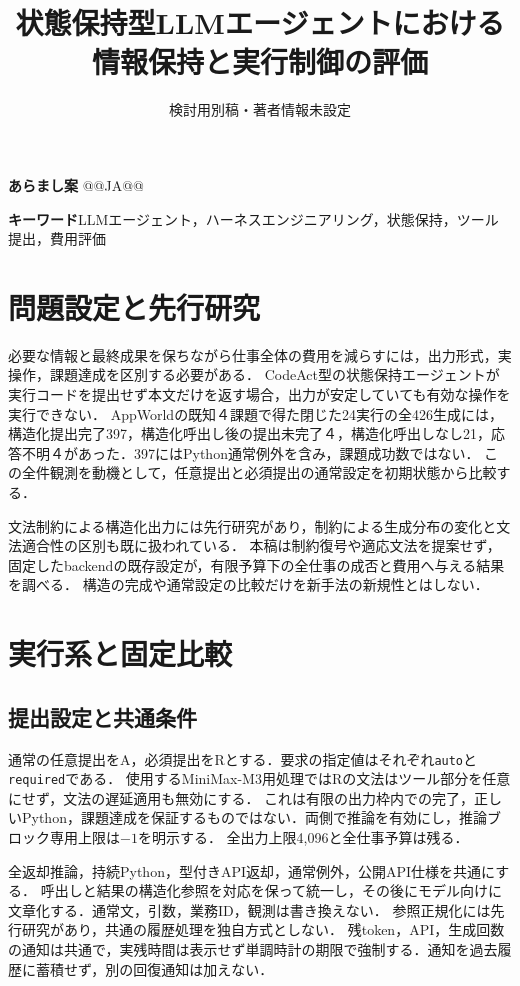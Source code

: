 \documentclass[uplatex,a4paper,twocolumn,10pt]{jsarticle}
\title{状態保持型LLMエージェントにおける\newline 情報保持と実行制御の評価}
\author{検討用別稿・著者情報未設定}
\date{}
\begin{document}
\raggedbottom
\maketitle
\noindent\textbf{あらまし案}\quad
@@JA@@

\noindent\textbf{キーワード}\quad LLMエージェント，ハーネスエンジニアリング，状態保持，ツール提出，費用評価

\section{問題設定と先行研究}
必要な情報と最終成果を保ちながら仕事全体の費用を減らすには，出力形式，実操作，課題達成を区別する必要がある．
CodeAct\cite{codeact}型の状態保持エージェントが実行コードを提出せず本文だけを返す場合，出力が安定していても有効な操作を実行できない．
AppWorld\cite{appworld}の既知４課題で得た閉じた24実行の全426生成には，構造化提出完了397，構造化呼出し後の提出未完了４，構造化呼出しなし21，応答不明４があった．397にはPython通常例外を含み，課題成功数ではない．
この全件観測を動機として，任意提出と必須提出の通常設定を初期状態から比較する．

文法制約による構造化出力\cite{gcd}には先行研究があり，制約による生成分布の変化と文法適合性の区別\cite{gad}も既に扱われている．
本稿は制約復号や適応文法を提案せず，固定したbackend\cite{backend}の既存設定が，有限予算下の全仕事の成否と費用へ与える結果を調べる．
構造の完成や通常設定の比較だけを新手法の新規性とはしない．

\section{実行系と固定比較}
\subsection{提出設定と共通条件}
通常の任意提出をA，必須提出をRとする．要求の指定値はそれぞれ\texttt{auto}と\texttt{required}である．
使用するMiniMax-M3用処理ではRの文法はツール部分を任意にせず，文法の遅延適用も無効にする．
これは有限の出力枠内での完了，正しいPython，課題達成を保証するものではない．両側で推論を有効にし，推論ブロック専用上限は$-1$を明示する．
全出力上限4,096と全仕事予算は残る．

全返却推論，持続Python，型付きAPI返却，通常例外，公開API仕様を共通にする．
呼出しと結果の構造化参照を対応を保って統一し，その後にモデル向けに文章化する．通常文，引数，業務ID，観測は書き換えない．
参照正規化には先行研究\cite{canonical}があり，共通の履歴処理を独自方式としない．
残token，API，生成回数の通知は共通で，実残時間は表示せず単調時計の期限で強制する．通知を過去履歴に蓄積せず，別の回復通知は加えない．
\end{document}
